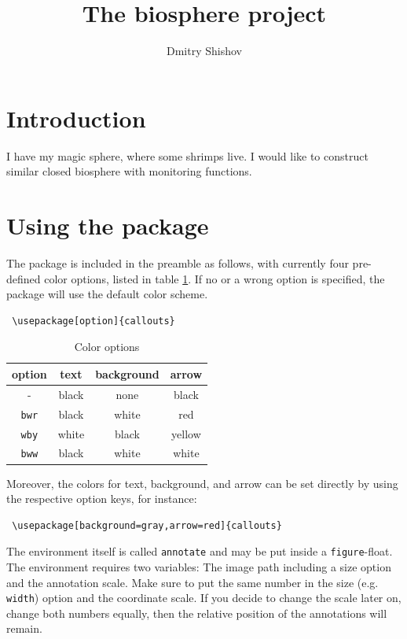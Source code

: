 \documentclass[a4paper,11pt]{article}
\title{The biosphere project }
\author{Dmitry Shishov}
\begin{document}
\maketitle

\section{Introduction}
I have my magic sphere, where some shrimps live. I would like to construct similar closed biosphere with monitoring functions.

\section{Using the package}

The package is included in the preamble as follows, with currently four pre-defined color options, listed in table \ref{tab:colors}. If no or a wrong option is specified, the package will use the default color scheme.

\begin{lstlisting}
 \usepackage[option]{callouts}
\end{lstlisting}

\begin{table}[htb]
 \centering
 \caption{Color options}\label{tab:colors}
 \begin{tabular}{cccc}
 \toprule
  option & text & background & arrow \\
  \midrule
  -& black & none & black \\
  \texttt{bwr}	& black & white & red \\
  \texttt{wby}	& white & black & yellow \\
  \texttt{bww}	& black & white & white\\
  \bottomrule
 \end{tabular}
\end{table}

Moreover, the colors for text, background, and arrow can be set directly by using the respective option keys, for instance:

\begin{lstlisting}
 \usepackage[background=gray,arrow=red]{callouts}
\end{lstlisting}

The environment itself is called \texttt{annotate} and may be put inside a \texttt{figure}-float. The environment requires two variables: The image path including a size option and the annotation scale. Make sure to put the same number in the size (e.g. \texttt{width}) option and the coordinate scale. If you decide to change the scale later on, change both numbers equally, then the relative position of the annotations will remain.
\end{document}
